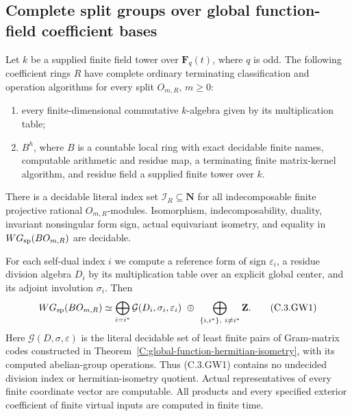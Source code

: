 \subsection{Complete split groups over global function-field coefficient bases}
\label{C:global-function-WG-subsection}

\begin{theorem}
\label{C:global-function-coefficient-WG}
Let $k$ be a supplied finite field tower over
$\mathbf F_q(t)$, where $q$ is odd.
The following coefficient rings $R$ have complete
ordinary terminating classification and operation
algorithms for every split $O_{m,R}$, $m\geq0$:
\begin{enumerate}
\item every finite-dimensional commutative $k$-algebra
given by its multiplication table;
\item $B^h$, where $B$ is a countable local ring
with exact decidable finite names, computable
arithmetic and residue map, a terminating finite
matrix-kernel algorithm, and residue field a
supplied finite tower over $k$.
\end{enumerate}
There is a decidable literal index set
$\mathscr I_R\subseteq\mathbf N$ for all
indecomposable finite projective rational
$O_{m,R}$-modules.
Isomorphism, indecomposability, duality,
invariant nonsingular form sign, actual
equivariant isometry, and equality in
$WG_{\rm sp}(BO_{m,R})$ are decidable.

For each self-dual index $i$ we compute a
reference form of sign $\varepsilon_i$,
a residue division algebra $D_i$ by its
multiplication table over an explicit
global center, and its adjoint involution
$\sigma_i$.
Then
\[
 WG_{\rm sp}(BO_{m,R})\simeq
   \bigoplus_{i=i^*}
       \mathcal G(D_i,\sigma_i,\varepsilon_i)
   \ \oplus\
   \bigoplus_{\{i,i^*\},\ i\ne i^*}\mathbf Z .             \tag{C.3.GW1}
\]
Here $\mathcal G(D,\sigma,\varepsilon)$ is
the literal decidable set of least finite
pairs of Gram-matrix codes constructed in
Theorem~\ref{C:global-function-hermitian-isometry},
with its computed abelian-group operations.
Thus (C.3.GW1) contains no undecided
division index or hermitian-isometry quotient.
Actual representatives of every finite
coordinate vector are computable.
All products and every specified
exterior coefficient of finite virtual
inputs are computed in finite time.
\end{theorem}
